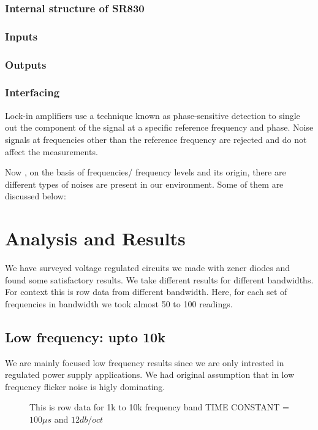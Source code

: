 \documentclass[12pt]{article}
\begin{document}
\subsubsection{Internal structure of SR830}

\subsubsection{Inputs}

\subsubsection{Outputs}

\subsubsection{Interfacing}



Lock-in amplifiers use a technique known as
phase-sensitive detection to single out the component of the signal at a specific reference frequency and phase. Noise signals at frequencies other than the reference frequency are rejected and do not affect the measurements.


Now , on the basis of frequencies/ frequency levels and its origin, there are different types of noises are present in our environment. Some of them are discussed below:



\clearpage
\section{Analysis and Results}

We have surveyed voltage regulated circuits we made with zener diodes and found some satisfactory results. We take different results for different bandwidths. For context this is row data from different bandwidth. Here, for each set of frequencies in bandwidth we took almost 50 to 100 readings.


\subsection{Low frequency: upto 10k}

We are mainly focused low frequency results since we are only intrested in regulated power supply applications. We had original assumption that in low frequency flicker noise is higly dominating.

\begin{figure}[hbt!]
\caption{This is row data for 1k to 10k frequency band TIME CONSTANT = $100\mu s$ and $12db/oct$}
\end{figure}\\
\end{document}
